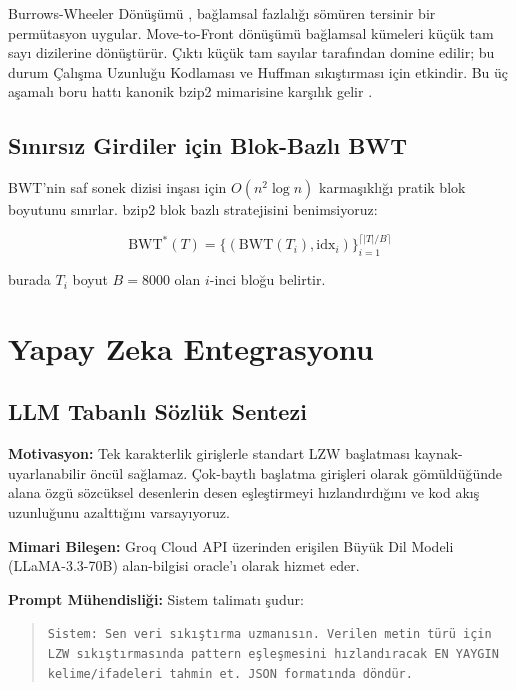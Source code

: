 \documentclass[conference]{IEEEtran}
\begin{document}
Burrows-Wheeler Dönüşümü \cite{burrows1994}, bağlamsal fazlalığı sömüren tersinir bir permütasyon uygular. Move-to-Front dönüşümü \cite{bentley1986} bağlamsal kümeleri küçük tam sayı dizilerine dönüştürür. Çıktı küçük tam sayılar tarafından domine edilir; bu durum Çalışma Uzunluğu Kodlaması ve Huffman sıkıştırması için etkindir. Bu üç aşamalı boru hattı kanonik bzip2 mimarisine karşılık gelir \cite{salomon2007}.

\subsection{Sınırsız Girdiler için Blok-Bazlı BWT}

BWT'nin saf sonek dizisi inşası için \(O(n^2 \log n)\) karmaşıklığı pratik blok boyutunu sınırlar. bzip2 blok bazlı stratejisini benimsiyoruz:

\begin{equation}
\text{BWT}^*(T) = \{(\text{BWT}(T_i), \text{idx}_i)\}_{i=1}^{\lceil |T|/B \rceil}
\label{eq:bwt_blocks}
\end{equation}

burada \(T_i\) boyut \(B = 8000\) olan \(i\)-inci bloğu belirtir.

\section{Yapay Zeka Entegrasyonu}

\subsection{LLM Tabanlı Sözlük Sentezi}

\noindent\textbf{Motivasyon:} Tek karakterlik girişlerle standart LZW başlatması kaynak-uyarlanabilir öncül sağlamaz. Çok-baytlı başlatma girişleri olarak gömüldüğünde alana özgü sözcüksel desenlerin desen eşleştirmeyi hızlandırdığını ve kod akış uzunluğunu azalttığını varsayıyoruz.

\noindent\textbf{Mimari Bileşen:} Groq Cloud API üzerinden erişilen Büyük Dil Modeli (LLaMA-3.3-70B) alan-bilgisi oracle'ı olarak hizmet eder.

\noindent\textbf{Prompt Mühendisliği:} Sistem talimatı şudur:

\begin{quote}
\small
\texttt{Sistem: Sen veri sıkıştırma uzmanısın. Verilen metin türü için LZW sıkıştırmasında pattern eşleşmesini hızlandıracak EN YAYGIN kelime/ifadeleri tahmin et. JSON formatında döndür.}
\end{quote}
\end{document}
